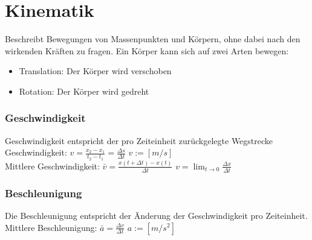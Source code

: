 
\section{Kinematik}

Beschreibt Bewegungen von Massenpunkten und 
Körpern, ohne dabei nach den wirkenden Kräften zu 
fragen.
Ein Körper kann sich auf zwei Arten bewegen: 
\begin{itemize}
	\item Translation: Der Körper wird verschoben
	\item Rotation: Der Körper wird gedreht
\end{itemize}

\subsubsection{Geschwindigkeit}
Geschwindigkeit entspricht der pro Zeiteinheit zurückgelegte Wegstrecke \\
Geschwindigkeit: $v = \frac{x_{2} - x_{1}}{t_{2} - t_{1}} = \frac{\Delta s}{\Delta t}$  $v:= [m/s]$ \\

Mittlere Geschwindigkeit: $ \bar{v} = \frac{x(t + \Delta t) - x(t)}{\Delta t}$  $v = \lim_{t \rightarrow 0} \frac{\Delta x}{\Delta t}$

\subsubsection{Beschleunigung}
Die Beschleunigung entspricht der Änderung der Geschwindigkeit pro Zeiteinheit. \\
Mittlere Beschleunigung: $\bar{a} = \frac{\Delta v}{ \Delta t} $   $a:= [m/s^2]$


